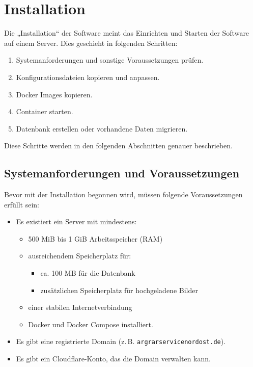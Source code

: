 \section{Installation}

Die „Installation“ der Software meint das Einrichten und Starten der Software auf einem Server. Dies
geschieht in folgenden Schritten:

\begin{enumerate}
    \item Systemanforderungen und sonstige Voraussetzungen prüfen.
    \item Konfigurationsdateien kopieren und anpassen.
    \item Docker Images kopieren.
    \item Container starten.
    \item Datenbank erstellen oder vorhandene Daten migrieren.
\end{enumerate}

\noindent Diese Schritte werden in den folgenden Abschnitten genauer beschrieben.

\subsection{Systemanforderungen und Voraussetzungen}

Bevor mit der Installation begonnen wird, müssen folgende Voraussetzungen erfüllt sein:

\begin{itemize}
    \item Es existiert ein Server mit mindestens:
    \begin{itemize}
        \item 500 MiB bis 1 GiB Arbeitsspeicher (RAM)
        \item ausreichendem Speicherplatz für:
        \begin{itemize}
            \item ca. 100 MB für die Datenbank
            \item zusätzlichen Speicherplatz für hochgeladene Bilder
        \end{itemize}
        \item einer stabilen Internetverbindung
        \item Docker und Docker Compose installiert.
    \end{itemize}
    \item Es gibt eine registrierte Domain (z.\,B. \texttt{argrarservicenordost.de}).
    \item Es gibt ein Cloudflare-Konto, das die Domain verwalten kann.
\end{itemize}

